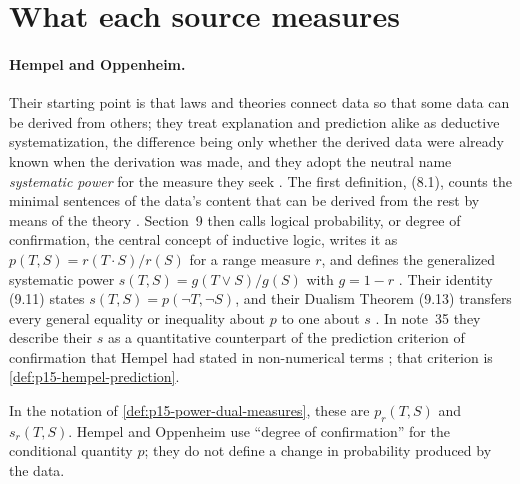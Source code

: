 \section{What each source measures}
\label{sec:p15-w02b-p15-025-sources}

\paragraph{Hempel and Oppenheim.}
Their starting point is that laws and theories connect data so that
some data can be derived from others; they treat explanation and
prediction alike as deductive systematization, the difference being only
whether the derived data were already known when the derivation was
made, and they adopt the neutral name \emph{systematic power} for the
measure they seek \cite[p.~164]{HempelOppenheim1948Explanation}. The
first definition, (8.1), counts the minimal sentences of the data's
content that can be derived from the rest by means of the theory
\cite[pp.~166--167]{HempelOppenheim1948Explanation}. Section~9 then
calls logical probability, or degree of confirmation, the central concept
of inductive logic, writes it as \(p(T,S)=r(T\cdot S)/r(S)\) for a range
measure \(r\), and defines the generalized systematic power
\(s(T,S)=g(T\vee S)/g(S)\) with \(g=1-r\)
\cite[pp.~168--172, (9.3), (9.6), (9.9), (9.10)]{HempelOppenheim1948Explanation}.
Their identity (9.11) states \(s(T,S)=p(\neg T,\neg S)\), and their
Dualism Theorem (9.13) transfers every general equality or inequality
about \(p\) to one about \(s\) \cite[pp.~172--173]{HempelOppenheim1948Explanation}.
In note~35 they describe their \(s\) as a quantitative counterpart of
the prediction criterion of confirmation that Hempel had stated in
non-numerical terms \cite[p.~168, n.~35]{HempelOppenheim1948Explanation};
that criterion is \cref{def:p15-hempel-prediction}.

In the notation of \cref{def:p15-power-dual-measures}, these are
\(p_r(T,S)\) and \(s_r(T,S)\). Hempel and Oppenheim use ``degree of
confirmation'' for the conditional quantity \(p\); they do not define a
change in probability produced by the data.

